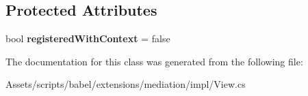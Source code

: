 \subsection*{Protected Attributes}
\begin{DoxyCompactItemize}
\item 
\hypertarget{classbabel_1_1extensions_1_1mediation_1_1impl_1_1_view_a4494ce112042c5bfccaba9082ac99650}{bool {\bfseries registered\-With\-Context} = false}\label{classbabel_1_1extensions_1_1mediation_1_1impl_1_1_view_a4494ce112042c5bfccaba9082ac99650}

\end{DoxyCompactItemize}


The documentation for this class was generated from the following file\-:\begin{DoxyCompactItemize}
\item 
Assets/scripts/babel/extensions/mediation/impl/View.\-cs\end{DoxyCompactItemize}
